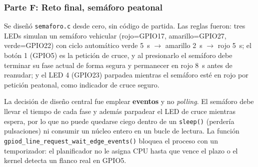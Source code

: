 \documentclass[conference]{IEEEtran}
\begin{document}
\subsubsection{Parte F: Reto final, semáforo peatonal}
Se diseñó \texttt{semaforo.c} desde cero, sin código de partida. Las reglas fueron: tres LEDs simulan un semáforo vehicular (rojo=GPIO17, amarillo=GPIO27, verde=GPIO22) con ciclo automático verde 5~s $\to$ amarillo 2~s $\to$ rojo 5~s; el botón 1 (GPIO5) es la petición de cruce, y al presionarlo el semáforo debe terminar su fase actual de forma segura y permanecer en rojo 8~s antes de reanudar; y el LED 4 (GPIO23) parpadea mientras el semáforo esté en rojo por petición peatonal, como indicador de cruce seguro.

La decisión de diseño central fue emplear \textbf{eventos} y no \textit{polling}. El semáforo debe llevar el tiempo de cada fase y además parpadear el LED de cruce mientras espera, por lo que no puede quedarse ciego dentro de un \texttt{sleep()} (perdería pulsaciones) ni consumir un núcleo entero en un bucle de lectura. La función \texttt{gpiod\_line\_request\_wait\_edge\_events()} bloquea el proceso con un temporizador: el planificador no le asigna CPU hasta que vence el plazo o el kernel detecta un flanco real en GPIO5.
\end{document}
